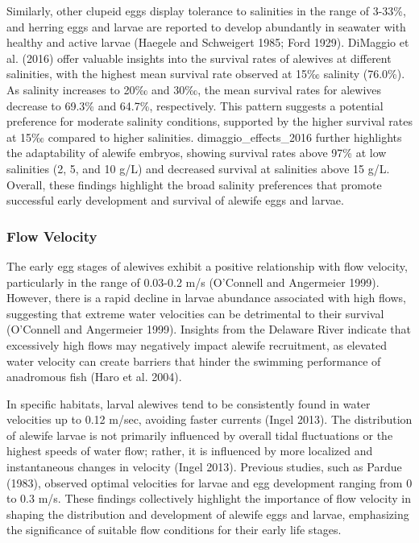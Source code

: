 \documentclass[
]{book}
\begin{document}
Similarly, other clupeid eggs display tolerance to salinities in the range of 3-33\%, and herring eggs and larvae are reported to develop abundantly in seawater with healthy and active larvae (Haegele and Schweigert 1985; Ford 1929). DiMaggio et al. (2016) offer valuable insights into the survival rates of alewives at different salinities, with the highest mean survival rate observed at 15‰ salinity (76.0\%). As salinity increases to 20‰ and 30‰, the mean survival rates for alewives decrease to 69.3\% and 64.7\%, respectively. This pattern suggests a potential preference for moderate salinity conditions, supported by the higher survival rates at 15‰ compared to higher salinities. dimaggio\_effects\_2016 further highlights the adaptability of alewife embryos, showing survival rates above 97\% at low salinities (2, 5, and 10 g/L) and decreased survival at salinities above 15 g/L. Overall, these findings highlight the broad salinity preferences that promote successful early development and survival of alewife eggs and larvae.

\hypertarget{flow-velocity-2}{%
\subsubsection{Flow Velocity}\label{flow-velocity-2}}

The early egg stages of alewives exhibit a positive relationship with flow velocity, particularly in the range of 0.03-0.2 m/s (O'Connell and Angermeier 1999). However, there is a rapid decline in larvae abundance associated with high flows, suggesting that extreme water velocities can be detrimental to their survival (O'Connell and Angermeier 1999). Insights from the Delaware River indicate that excessively high flows may negatively impact alewife recruitment, as elevated water velocity can create barriers that hinder the swimming performance of anadromous fish (Haro et al. 2004).

In specific habitats, larval alewives tend to be consistently found in water velocities up to 0.12 m/sec, avoiding faster currents (Ingel 2013). The distribution of alewife larvae is not primarily influenced by overall tidal fluctuations or the highest speeds of water flow; rather, it is influenced by more localized and instantaneous changes in velocity (Ingel 2013). Previous studies, such as Pardue (1983), observed optimal velocities for larvae and egg development ranging from 0 to 0.3 m/s. These findings collectively highlight the importance of flow velocity in shaping the distribution and development of alewife eggs and larvae, emphasizing the significance of suitable flow conditions for their early life stages.
\end{document}
